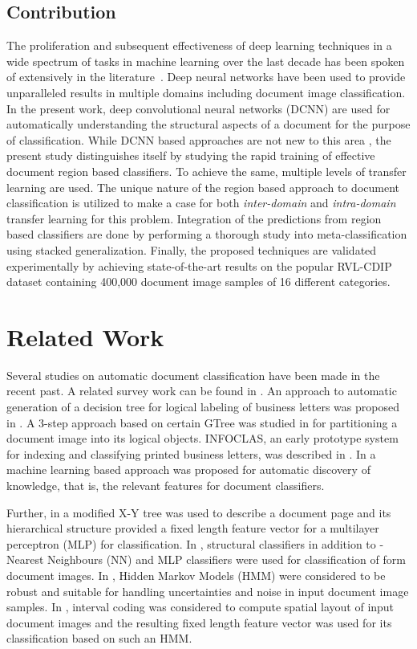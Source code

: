 \documentclass[10pt,conference,a4paper]{IEEEtran}
\begin{document}
\subsection{Contribution}
The proliferation and subsequent effectiveness of deep learning techniques in a wide spectrum of tasks in machine learning over the last decade has been spoken of extensively in the literature~\cite{schmidhuber2015deep,lecun2015deep}. Deep neural networks have been used to provide unparalleled results in multiple domains including document image classification. In the present work, deep convolutional neural networks (DCNN) are used for automatically understanding the structural aspects of a document for the purpose of classification. While DCNN based approaches are not new to this area \cite{kang2014, afzal2015, harley2015evaluation}, the present study distinguishes itself by studying the rapid training of effective document region based classifiers. To achieve the same, multiple levels of transfer learning are used. The unique nature of the region based approach to document classification is utilized to make a case for both \textit{inter-domain} and \textit{intra-domain} transfer learning for this problem. Integration of the predictions from region based classifiers are done by performing a thorough study into meta-classification using stacked generalization. Finally, the proposed techniques are validated experimentally by achieving state-of-the-art results on the popular RVL-CDIP dataset containing 400,000 document image samples of 16 different categories.

\section{Related Work}


Several studies on automatic document classification have been made in the recent past. A related survey work can be found in \cite{chen2007}. An approach to automatic generation of a decision tree for logical labeling of business letters was proposed in \cite{dengel1993}. A 3-step approach based on certain GTree was studied in \cite{dengel1994} for partitioning a document image into its logical objects. INFOCLAS, an early prototype system  for indexing and classifying printed business letters, was described in \cite{Hoch1994}. In \cite{Junker1997} a machine learning based approach was proposed for automatic discovery of knowledge, that is, the relevant features for document classifiers.

Further, in \cite{cesarini2001} a modified X-Y tree was used to describe a document page and its hierarchical structure provided a fixed length feature vector for a multilayer perceptron (MLP) for classification. In \cite{heroux1998}, structural classifiers in addition to -Nearest Neighbours (NN) and MLP classifiers were used for classification of form document images. In \cite{rabiner1990}, Hidden Markov Models (HMM) were considered to be robust and suitable for handling uncertainties and noise in input document image samples. In \cite{hu2000}, interval coding was considered to compute spatial layout of input document images and the resulting fixed length feature vector was used for its classification based on such an HMM.
\end{document}
